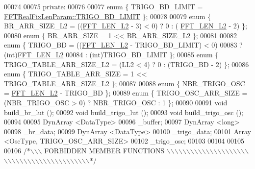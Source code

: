 \begin{DoxyCode}
00074 
00075 \textcolor{keyword}{private}:
00076 
00077     \textcolor{keyword}{enum} \{          TRIGO\_BD\_LIMIT  = \hyperlink{a00012_a7a7b234f07dec3342f211f70fc354249acc7080c97a1906e1284b5c5b467bf068}{FFTRealFixLenParam::TRIGO\_BD\_LIMIT}  
      \};
00078 
00079     \textcolor{keyword}{enum} \{          BR\_ARR\_SIZE\_L2  = ((\hyperlink{a00011_af15d6305b69f1309e44281ede12ea234a309dfdb424deea1d8799f1cda9d678db}{FFT\_LEN\_L2} - 3) < 0) ? 0 : (
      \hyperlink{a00011_af15d6305b69f1309e44281ede12ea234a309dfdb424deea1d8799f1cda9d678db}{FFT\_LEN\_L2} - 2)   \};
00080     \textcolor{keyword}{enum} \{          BR\_ARR\_SIZE     = 1 << BR\_ARR\_SIZE\_L2   \};
00081 
00082    \textcolor{keyword}{enum} \{           TRIGO\_BD            =   ((\hyperlink{a00011_af15d6305b69f1309e44281ede12ea234a309dfdb424deea1d8799f1cda9d678db}{FFT\_LEN\_L2} - TRIGO\_BD\_LIMIT) < 0)
00083                                               ? (int)\hyperlink{a00011_af15d6305b69f1309e44281ede12ea234a309dfdb424deea1d8799f1cda9d678db}{FFT\_LEN\_L2}
00084                                               : (\textcolor{keywordtype}{int})TRIGO\_BD\_LIMIT \};
00085     \textcolor{keyword}{enum} \{          TRIGO\_TABLE\_ARR\_SIZE\_L2 = (LL2 < 4) ? 0 : (TRIGO\_BD - 2)    \};
00086     \textcolor{keyword}{enum} \{          TRIGO\_TABLE\_ARR\_SIZE    = 1 << TRIGO\_TABLE\_ARR\_SIZE\_L2  \};
00087 
00088     \textcolor{keyword}{enum} \{          NBR\_TRIGO\_OSC           = \hyperlink{a00011_af15d6305b69f1309e44281ede12ea234a309dfdb424deea1d8799f1cda9d678db}{FFT\_LEN\_L2} - TRIGO\_BD   \};
00089     \textcolor{keyword}{enum} \{          TRIGO\_OSC\_ARR\_SIZE  =   (NBR\_TRIGO\_OSC > 0) ? NBR\_TRIGO\_OSC : 1 \};
00090 
00091     \textcolor{keywordtype}{void}                build\_br\_lut ();
00092     \textcolor{keywordtype}{void}                build\_trigo\_lut ();
00093     \textcolor{keywordtype}{void}                build\_trigo\_osc ();
00094 
00095     DynArray <DataType>
00096                         \_buffer;
00097     DynArray <long>
00098                         \_br\_data;
00099     DynArray <DataType>
00100                         \_trigo\_data;
00101    Array <OscType, TRIGO\_OSC\_ARR\_SIZE>
00102                         \_trigo\_osc;
00103 
00104 
00105 
00106 \textcolor{comment}{/*\(\backslash\)\(\backslash\)\(\backslash\) FORBIDDEN MEMBER FUNCTIONS \(\backslash\)\(\backslash\)\(\backslash\)\(\backslash\)\(\backslash\)\(\backslash\)\(\backslash\)\(\backslash\)\(\backslash\)\(\backslash\)\(\backslash\)\(\backslash\)\(\backslash\)\(\backslash\)\(\backslash\)\(\backslash\)\(\backslash\)\(\backslash\)\(\backslash\)\(\backslash\)\(\backslash\)\(\backslash\)\(\backslash\)\(\backslash\)\(\backslash\)\(\backslash\)\(\backslash\)\(\backslash\)\(\backslash\)\(\backslash\)\(\backslash\)\(\backslash\)\(\backslash\)\(\backslash\)\(\backslash\)\(\backslash\)\(\backslash\)\(\backslash\)\(\backslash\)\(\backslash\)\(\backslash\)\(\backslash\)\(\backslash\)*/}

\end{DoxyCode}
